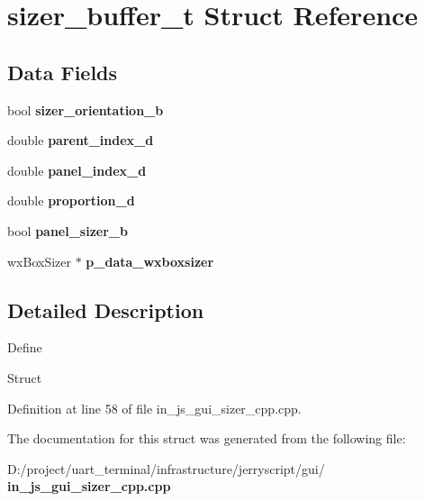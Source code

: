 \section{sizer\+\_\+buffer\+\_\+t Struct Reference}
\label{structsizer__buffer__t}
\subsection*{Data Fields}
\begin{DoxyCompactItemize}
\item 
\mbox{\label{structsizer__buffer__t_a7dac49d74e11d058f831963b78f5ecb9}} 
bool {\bfseries sizer\+\_\+orientation\+\_\+b}
\item 
\mbox{\label{structsizer__buffer__t_add751934d2a529afad976d242fc55e2a}} 
double {\bfseries parent\+\_\+index\+\_\+d}
\item 
\mbox{\label{structsizer__buffer__t_a45b7a2c22221685e5adddbf8103dbd0f}} 
double {\bfseries panel\+\_\+index\+\_\+d}
\item 
\mbox{\label{structsizer__buffer__t_a93e3ac3895fbb25863fb66af78e0ed39}} 
double {\bfseries proportion\+\_\+d}
\item 
\mbox{\label{structsizer__buffer__t_a90ec21f584d3ff4e0b46638dcbd75511}} 
bool {\bfseries panel\+\_\+sizer\+\_\+b}
\item 
\mbox{\label{structsizer__buffer__t_a5575261b498c096138b83ca6ca568520}} 
wx\+Box\+Sizer $\ast$ {\bfseries p\+\_\+data\+\_\+wxboxsizer}
\end{DoxyCompactItemize}


\subsection{Detailed Description}
Define

Struct 

Definition at line 58 of file in\+\_\+js\+\_\+gui\+\_\+sizer\+\_\+cpp.\+cpp.



The documentation for this struct was generated from the following file\+:\begin{DoxyCompactItemize}
\item 
D\+:/project/uart\+\_\+terminal/infrastructure/jerryscript/gui/\textbf{ in\+\_\+js\+\_\+gui\+\_\+sizer\+\_\+cpp.\+cpp}\end{DoxyCompactItemize}
